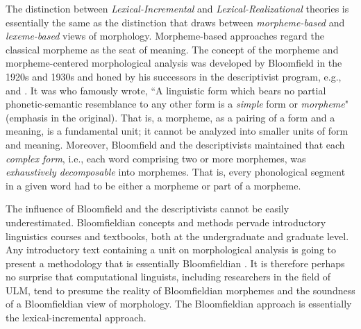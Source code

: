 The distinction between \emph{Lexical-Incremental} 
and \emph{Lexical-Realizational} 
theories is essentially the same as the distinction 
that \cite{aronoff:1994} draws
between \emph{morpheme-based} and \emph{lexeme-based} 
views of morphology. Morpheme-based approaches regard 
the classical morpheme as the seat of meaning.
The concept of the morpheme and morpheme-centered morphological analysis
was developed by Bloomfield in the 1920s and 1930s 
\citep{bloomfield:1926, bloomfield:1933} and honed by his 
successors in the descriptivist program, e.g., 
\cite{hockett:1947} and \cite{harris:1955}.
It was \cite[][p. 161]{bloomfield:1933} who famously wrote, ``A linguistic form 
which bears no partial phonetic-semantic resemblance to any other form is a \emph{simple} form or \emph{morpheme}" (emphasis in the original). 
That is, a morpheme, as a pairing of a form and a meaning, is a fundamental unit; it cannot be analyzed into smaller units
of form and meaning.
Moreover, Bloomfield and the descriptivists maintained that
each \emph{complex form}, i.e., each word comprising 
two or more morphemes, was \emph{exhaustively decomposable} 
into morphemes. That is, every phonological segment
in a given word had to be either a morpheme or part of a morpheme. 

The influence of Bloomfield and the descriptivists
cannot be easily underestimated. Bloomfieldian concepts and methods 
pervade introductory linguistics courses and textbooks, both at
the undergraduate and graduate level. Any introductory text containing 
a unit on morphological analysis is going to present a methodology that 
is essentially Bloomfieldian \citep{anderson:2017}.
It is therefore perhaps no surprise that
computational linguists, including researchers in the field of \ac{ULM}, 
tend to presume
the reality of Bloomfieldian morphemes and the soundness of a 
Bloomfieldian view of morphology. The Bloomfieldian approach is essentially
the lexical-incremental approach.

